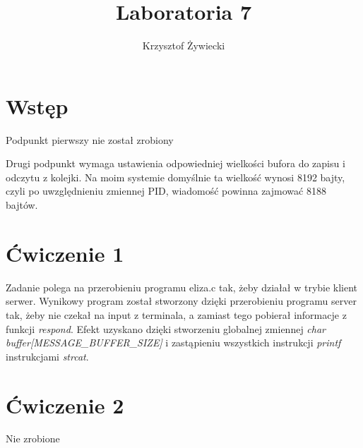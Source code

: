 \documentclass[a4paper, 11pt]{article}
\title{Laboratoria 7}
\author{Krzysztof Żywiecki}
\begin{document}
	
	\maketitle
	
	\section*{Wstęp}
	
	Podpunkt pierwszy nie został zrobiony
	
	Drugi podpunkt wymaga ustawienia odpowiedniej wielkości bufora do zapisu i odczytu z kolejki. Na moim systemie domyślnie ta wielkość wynosi 8192 bajty, czyli po uwzględnieniu zmiennej PID, wiadomość powinna zajmować 8188 bajtów.
	
	\section*{Ćwiczenie 1}
	
	Zadanie polega na przerobieniu programu eliza.c tak, żeby działał w trybie klient serwer. Wynikowy program został stworzony dzięki przerobieniu programu server tak, żeby nie czekał na input z terminala, a zamiast tego pobierał informacje z funkcji \emph{respond}. Efekt uzyskano dzięki stworzeniu globalnej zmiennej \emph{char buffer[MESSAGE\_BUFFER\_SIZE]} i zastąpieniu wszystkich instrukcji \emph{printf} instrukcjami \emph{strcat}. 
	
	\section*{Ćwiczenie 2}
	
	Nie zrobione 
	
	
	
\end{document}
